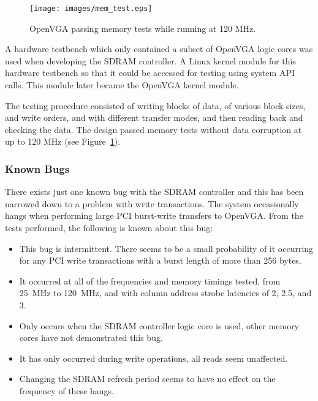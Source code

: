 \begin{figure}[h!]
\begin{center}
\texttt{[image: images/mem\_test.eps]}
\caption[SDRAM Memory Test Results]{OpenVGA passing memory tests
while running at 120 MHz.}
\label{MEM_Testing}
\end{center}
\end{figure}

A hardware testbench which only contained a subset of OpenVGA logic cores was
used when developing the SDRAM controller. A Linux kernel module for this
hardware testbench so that it could be accessed for testing using system API
calls. This module later became the OpenVGA kernel module.

The testing procedure consisted of writing blocks of data, of various block
sizes, and write orders, and with different transfer modes, and then reading back
and checking the data. The design passed memory tests without data corruption at
up to 120 MHz (see Figure~\ref{MEM_Testing}).


\subsubsection{Known Bugs}
\label{SDRAM_Bug}

There exists just one known bug with the SDRAM controller and this has been
narrowed down to a problem with write transactions. The system occasionally hangs
when performing large PCI burst-write transfers to OpenVGA. From the tests
performed, the following is known about this bug:

\begin{itemize}
  \item This bug is intermittent. There seems to be a small probability of it
  occurring for any PCI write transactions with a burst length of more than 256
  bytes.
  \item It occurred at all of the frequencies and memory timings tested, from
  25~MHz to 120~MHz, and with column address strobe latencies of 2, 2.5, and 3.
  \item Only occurs when the SDRAM controller logic core is used, other memory
  cores have not demonstrated this bug.
  \item It has only occurred during write operations, all reads seem unaffected.
  \item Changing the SDRAM refresh period seems to have no effect on the
  frequency of these hangs.
\end{itemize}

